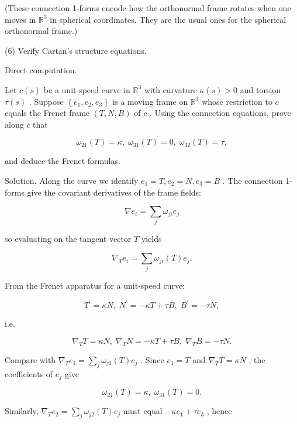 \documentclass[10pt]{article}
\begin{document}
(These connection 1-forms encode how the orthonormal frame rotates when one moves in \({\mathbb{R}}^{3}\) in spherical coordinates. They are the usual ones for the spherical orthonormal frame.)

(6) Verify Cartan's structure equations.

Direct computation.

\begin{problem}[title=PROBLEM 2 (3 POINTS)]
Let \(c\left( s\right)\) be a unit-speed curve in \({\mathbb{R}}^{3}\) with curvature \(\kappa \left( s\right)  > 0\) and torsion \(\tau \left( s\right)\) . Suppose \(\left\{  {{e}_{1},{e}_{2},{e}_{3}}\right\}\) is a moving frame on \({\mathbb{R}}^{3}\) whose restriction to \(c\) equals the Frenet frame \(\left( {T,N,B}\right)\) of \(c\) . Using the connection equations, prove along \(c\) that

\[
{\omega }_{21}\left( T\right)  = \kappa ,\;{\omega }_{31}\left( T\right)  = 0,\;{\omega }_{32}\left( T\right)  = \tau ,
\]

and deduce the Frenet formulas.
\end{problem}

Solution. Along the curve we identify \({e}_{1} = T,{e}_{2} = N,{e}_{3} = B\) . The connection 1-forms give the covariant derivatives of the frame fields:

\[
\nabla {e}_{i} = \mathop{\sum }\limits_{j}{\omega }_{ji}{e}_{j}
\]

so evaluating on the tangent vector \(T\) yields

\[
{\nabla }_{T}{e}_{i} = \mathop{\sum }\limits_{j}{\omega }_{ji}\left( T\right) {e}_{j}.
\]

From the Frenet apparatus for a unit-speed curve:

\[
{T}^{\prime } = {\kappa N},\;{N}^{\prime } =  - {\kappa T} + {\tau B},\;{B}^{\prime } =  - {\tau N},
\]

i.e.

\[
{\nabla }_{T}T = {\kappa N},\;{\nabla }_{T}N =  - {\kappa T} + {\tau B},\;{\nabla }_{T}B =  - {\tau N}.
\]

Compare with \({\nabla }_{T}{e}_{1} = \mathop{\sum }\limits_{j}{\omega }_{j1}\left( T\right) {e}_{j}\) . Since \({e}_{1} = T\) and \({\nabla }_{T}T = {\kappa N}\) , the coefficients of \({e}_{j}\) give

\[
{\omega }_{21}\left( T\right)  = \kappa ,\;{\omega }_{31}\left( T\right)  = 0.
\]

Similarly, \({\nabla }_{T}{e}_{2} = \mathop{\sum }\limits_{j}{\omega }_{j2}\left( T\right) {e}_{j}\) must equal \(- \kappa {e}_{1} + \tau {e}_{3}\) , hence
\end{document}
